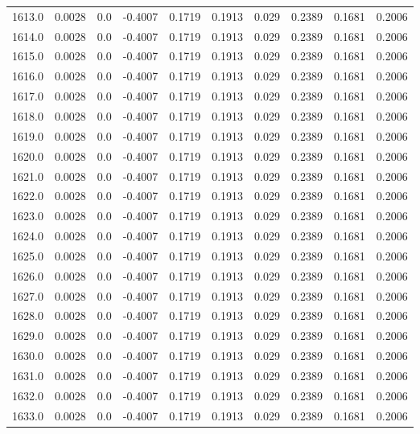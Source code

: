 \begin{longtable}{lrrrrrrrrr}
1613.0 & 0.0028 & 0.0 & -0.4007 & 0.1719 & 0.1913 & 0.029 & 0.2389 & 0.1681 & 0.2006 \\
1614.0 & 0.0028 & 0.0 & -0.4007 & 0.1719 & 0.1913 & 0.029 & 0.2389 & 0.1681 & 0.2006 \\
1615.0 & 0.0028 & 0.0 & -0.4007 & 0.1719 & 0.1913 & 0.029 & 0.2389 & 0.1681 & 0.2006 \\
1616.0 & 0.0028 & 0.0 & -0.4007 & 0.1719 & 0.1913 & 0.029 & 0.2389 & 0.1681 & 0.2006 \\
1617.0 & 0.0028 & 0.0 & -0.4007 & 0.1719 & 0.1913 & 0.029 & 0.2389 & 0.1681 & 0.2006 \\
1618.0 & 0.0028 & 0.0 & -0.4007 & 0.1719 & 0.1913 & 0.029 & 0.2389 & 0.1681 & 0.2006 \\
1619.0 & 0.0028 & 0.0 & -0.4007 & 0.1719 & 0.1913 & 0.029 & 0.2389 & 0.1681 & 0.2006 \\
1620.0 & 0.0028 & 0.0 & -0.4007 & 0.1719 & 0.1913 & 0.029 & 0.2389 & 0.1681 & 0.2006 \\
1621.0 & 0.0028 & 0.0 & -0.4007 & 0.1719 & 0.1913 & 0.029 & 0.2389 & 0.1681 & 0.2006 \\
1622.0 & 0.0028 & 0.0 & -0.4007 & 0.1719 & 0.1913 & 0.029 & 0.2389 & 0.1681 & 0.2006 \\
1623.0 & 0.0028 & 0.0 & -0.4007 & 0.1719 & 0.1913 & 0.029 & 0.2389 & 0.1681 & 0.2006 \\
1624.0 & 0.0028 & 0.0 & -0.4007 & 0.1719 & 0.1913 & 0.029 & 0.2389 & 0.1681 & 0.2006 \\
1625.0 & 0.0028 & 0.0 & -0.4007 & 0.1719 & 0.1913 & 0.029 & 0.2389 & 0.1681 & 0.2006 \\
1626.0 & 0.0028 & 0.0 & -0.4007 & 0.1719 & 0.1913 & 0.029 & 0.2389 & 0.1681 & 0.2006 \\
1627.0 & 0.0028 & 0.0 & -0.4007 & 0.1719 & 0.1913 & 0.029 & 0.2389 & 0.1681 & 0.2006 \\
1628.0 & 0.0028 & 0.0 & -0.4007 & 0.1719 & 0.1913 & 0.029 & 0.2389 & 0.1681 & 0.2006 \\
1629.0 & 0.0028 & 0.0 & -0.4007 & 0.1719 & 0.1913 & 0.029 & 0.2389 & 0.1681 & 0.2006 \\
1630.0 & 0.0028 & 0.0 & -0.4007 & 0.1719 & 0.1913 & 0.029 & 0.2389 & 0.1681 & 0.2006 \\
1631.0 & 0.0028 & 0.0 & -0.4007 & 0.1719 & 0.1913 & 0.029 & 0.2389 & 0.1681 & 0.2006 \\
1632.0 & 0.0028 & 0.0 & -0.4007 & 0.1719 & 0.1913 & 0.029 & 0.2389 & 0.1681 & 0.2006 \\
1633.0 & 0.0028 & 0.0 & -0.4007 & 0.1719 & 0.1913 & 0.029 & 0.2389 & 0.1681 & 0.2006 \\

\end{longtable}
